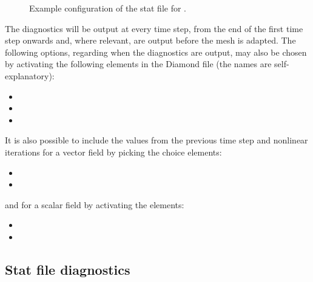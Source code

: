 \begin{figure}[ht]
  \centering
  \caption{Example configuration of the stat file for .}
  \label{fig:diamond_enable_stat}
\end{figure}

The diagnostics will be output at every time step, from the end of the first time step onwards and, where relevant, are output before the mesh is adapted. The following options, regarding when the diagnostics are output, may also be chosen by activating the following elements in the Diamond file (the names are self-explanatory):
\begin{itemize}
\item {}
\item {}
\item {}
\end{itemize}  

It is also possible to include the values from the previous time step and nonlinear iterations for a vector field by picking the choice elements:
\begin{itemize}
\item {}
\item {}
\end{itemize}

and for a scalar field by activating the elements:

\begin{itemize}
\item {}
\item {}
\end{itemize}

\subsection{Stat file diagnostics}
\label{sect:stat_diagnostics}

